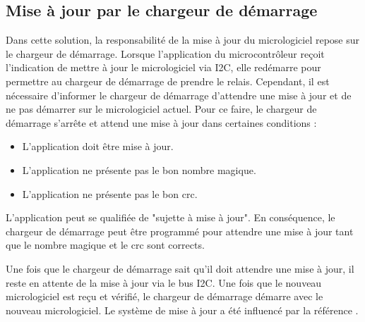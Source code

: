 \subsection{Mise à jour par le chargeur de démarrage}

Dans cette solution, la responsabilité de la mise à jour du micrologiciel repose sur le chargeur de démarrage.
Lorsque l'application du microcontrôleur reçoit l'indication de mettre à jour le micrologiciel via I2C, elle redémarre pour permettre au chargeur de démarrage de prendre le relais.
Cependant, il est nécessaire d'informer le chargeur de démarrage d'attendre une mise à jour et de ne pas démarrer sur le micrologiciel actuel.
Pour ce faire, le chargeur de démarrage s'arrête et attend une mise à jour dans certaines conditions :

\begin{itemize}
    \item L'application doit être mise à jour.
    \item L'application ne présente pas le bon nombre magique.
    \item L'application ne présente pas le bon \gls{crc}.
\end{itemize}

L'application peut se qualifiée de "sujette à mise à jour".
En conséquence, le chargeur de démarrage peut être programmé pour attendre une mise à jour tant que le nombre magique et le \gls{crc} sont corrects.

Une fois que le chargeur de démarrage sait qu'il doit attendre une mise à jour, il reste en attente de la mise à jour via le bus I2C.
Une fois que le nouveau micrologiciel est reçu et vérifié, le chargeur de démarrage démarre avec le nouveau micrologiciel.
Le système de mise à jour a été influencé par la référence \cite{reindl2020software}.

